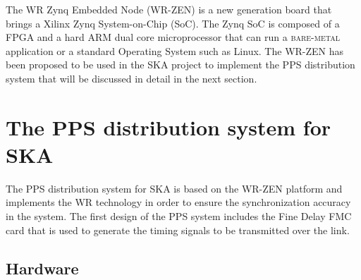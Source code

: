 \documentclass[review]{elsarticle}
\begin{document}

The WR Zynq Embedded Node (WR-ZEN) is a new generation board that brings a Xilinx Zynq System-on-Chip (SoC). The Zynq SoC is composed of a FPGA and a hard ARM dual core microprocessor that can run a \textsc{bare-metal} application or a standard Operating System such as Linux. The WR-ZEN has been proposed to be used in the SKA project to implement the PPS distribution system that will be discussed in detail in the next section.

\section{The PPS distribution system for SKA}

%
%

The PPS distribution system for SKA is based on the WR-ZEN platform and implements the WR technology in order to ensure the synchronization accuracy in the system. The first design of the PPS system includes the Fine Delay FMC card that is used to generate the timing signals to be transmitted over the link.

\subsection{Hardware}

%
%
\end{document}

